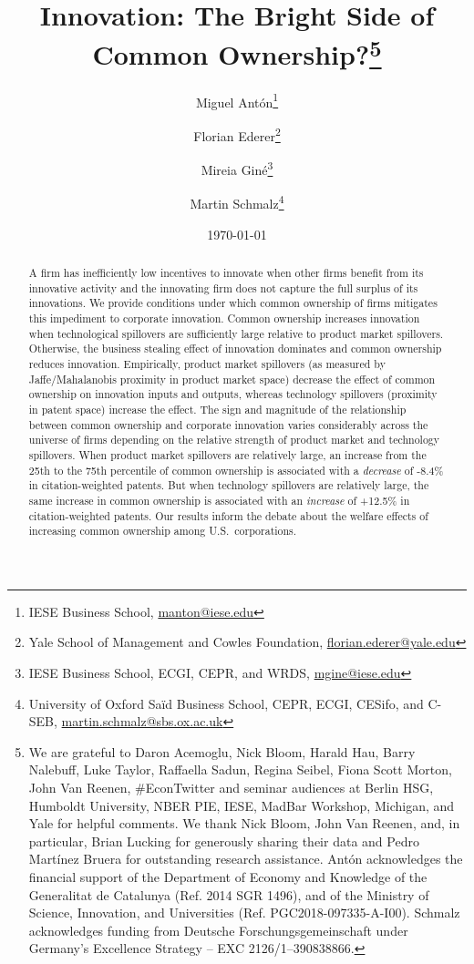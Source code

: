 \documentclass[12pt]{article}
\title{\vspace{-2.5cm} Innovation: The Bright Side of Common Ownership?\thanks{We are grateful to Daron Acemoglu, Nick Bloom, Harald Hau, Barry Nalebuff, Luke Taylor, Raffaella Sadun, Regina Seibel, Fiona Scott Morton, John Van Reenen, \#EconTwitter and seminar audiences at Berlin HSG, Humboldt University, NBER PIE, IESE, MadBar Workshop, Michigan, and Yale for helpful comments. We thank Nick Bloom, John Van Reenen, and, in particular, Brian Lucking for generously sharing their data and Pedro Mart\'inez Bruera for outstanding research assistance. Ant\'on acknowledges the financial support of the Department of Economy and Knowledge of the Generalitat de Catalunya (Ref. 2014 SGR 1496), and of the Ministry of Science, Innovation, and Universities (Ref. PGC2018-097335-A-I00). Schmalz acknowledges funding from Deutsche Forschungsgemeinschaft under Germany's Excellence Strategy – EXC 2126/1–390838866.}}
\author{Miguel Ant\'{o}n\thanks{IESE Business School, \href{mailto:manton@iese.edu}{manton@iese.edu}} \and Florian Ederer\thanks{Yale School of Management and Cowles Foundation, \href{mailto:florian.ederer@yale.edu}{florian.ederer@yale.edu}} \and Mireia Gin\'{e}\thanks{IESE Business School, ECGI, CEPR, and WRDS, \href{mailto:mgine@iese.edu}{mgine@iese.edu}} \and Martin Schmalz\thanks{University of Oxford Sa\"{i}d Business School, CEPR, ECGI, CESifo, and C-SEB, \href{mailto:martin.schmalz@sbs.ox.ac.uk}{martin.schmalz@sbs.ox.ac.uk}}}
\date{\today\vspace{-1cm}}
\begin{document}
\maketitle
\thispagestyle{empty}


\begin{abstract}
\noindent A firm has inefficiently low incentives to innovate when other firms benefit from its innovative activity and the innovating firm does not capture the full surplus of its innovations. We provide conditions under which common ownership of firms mitigates this impediment to corporate innovation. Common ownership increases innovation when technological spillovers are sufficiently large relative to product market spillovers. Otherwise, the business stealing effect of innovation dominates and common ownership reduces innovation. Empirically, product market spillovers (as measured by Jaffe/Mahalanobis proximity in product market space) decrease the effect of common ownership on innovation inputs and outputs, whereas technology spillovers (proximity in patent space) increase the effect. The sign and magnitude of the relationship between common ownership and corporate innovation varies considerably across the universe of firms depending on the relative strength of product market and technology spillovers. When product market spillovers are relatively large, an increase from the 25th to the 75th percentile of common ownership is associated with a \emph{decrease} of -8.4\% in citation-weighted patents. But when technology spillovers are relatively large, the same increase in common ownership is associated with an \emph{increase} of +12.5\% in citation-weighted patents. Our results inform the debate about the welfare effects of increasing common ownership among U.S.~corporations. 



\end{abstract}
\end{document}
